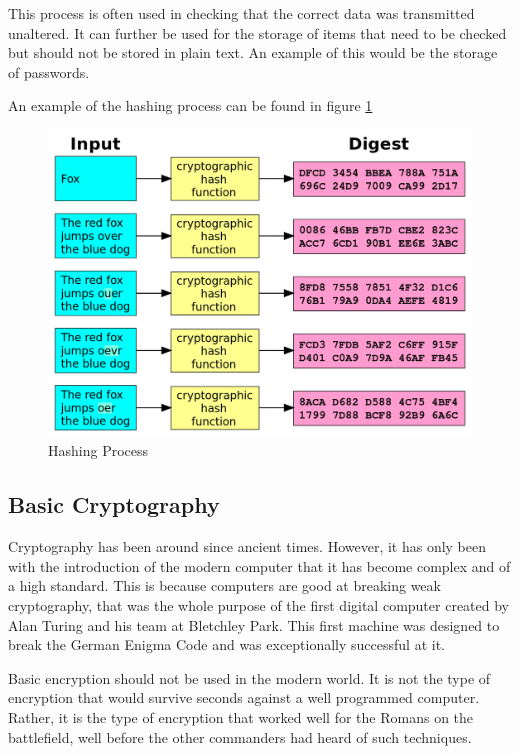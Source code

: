 \documentclass[a4paper,11pt]{report}
\begin{document}
				This process is often used in checking that the correct data was transmitted unaltered. 
				It can further be used for the storage of items that need to be checked but should not be stored in plain text. 
				An example of this would be the storage of passwords. 
				
				An example of the hashing process can be found in figure \ref{fig:HashingProcess}
				\begin{figure}[htb]
					\centering
					\includegraphics[scale=0.25]{./HashProcess.png}
					\caption{Hashing Process}
					\label{fig:HashingProcess}
				\end{figure}



		\subsection{Basic Cryptography}
			Cryptography has been around since ancient times. 
			However, it has only been with the introduction of the modern computer that it has become complex and of a high standard. 
			This is because computers are good at breaking weak cryptography, that was the whole purpose of the first digital computer created by Alan Turing and his team at Bletchley Park. 
			This first machine was designed to break the German Enigma Code and was exceptionally successful at it. 

			Basic encryption should not be used in the modern world. 
			It is not the type of encryption that would survive seconds against a well programmed computer. 
			Rather, it is the type of encryption that worked well for the Romans on the battlefield, well before the other commanders had heard of such techniques. 
\end{document}
